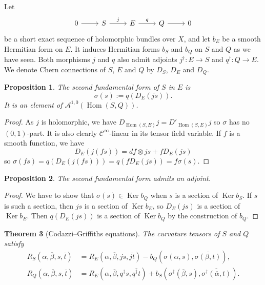 \documentclass[10pt,a4paper]{amsart}
\newtheorem{theo}{Theorem}[section]
\newtheorem{prop}[theo]{Proposition}
\theoremstyle{definition}
\newcommand{\cc}[1]{\mathcal{#1}}
\def\ov#1{\overline{#1}}
\DeclareMathOperator{\Ker}{Ker}
\DeclareMathOperator{\Hom}{Hom}
\def\snd{\sigma}
\begin{document}
Let
\[
\begin{tikzcd}
0 \ar[r] &
S \ar[r,"j"] &
E \ar[r,"q"] &
Q \ar[r] &
0
\end{tikzcd}
\]
be a short exact sequence of holomorphic bundles over $X$, and let $b_E$ be a smooth Hermitian form on $E$. It induces Hermitian forms $b_S$ and $b_Q$ on $S$ and $Q$ as we have seen. Both morphisms $j$ and $q$ also admit adjoints $j^\dagger: E \to S$ and $q^\dagger : Q \to E$. We denote Chern connections of $S$, $E$ and $Q$ by $D_S$, $D_E$ and $D_Q$.




\begin{prop}
The \emph{second fundamental form} of $S$ in $E$ is
\[
\snd(s) := q(D_E(js)).
\]
It is an element of $\cc A^{1,0}(\Hom(S,Q))$.
\end{prop}

\begin{proof}
As $j$ is holomorphic, we have $D_{\Hom(S,E)}j = D'_{\Hom(S,E)}j$ so $\snd$ has no $(0,1)$-part. It is also clearly $\cc C^\infty$-linear in its tensor field variable. If $f$ is a smooth function, we have
\[
D_E(j(fs))
= df \otimes js + f D_E(js)
\]
so $\snd(fs) = q(D_E(j(fs))) = q(f D_E(js)) = f\snd(s)$.
\end{proof}


\begin{prop}
The second fundamental form admits an adjoint.
\end{prop}

\begin{proof}
We have to show that $\snd(s) \in \Ker b_Q$ when $s$ is a section of $\Ker
b_S$. If $s$ is such a section, then $js$ is a section of $\Ker b_E$, so
$D_E(js)$ is a section of $\Ker b_E$. Then $q(D_E(js))$ is a section of $\Ker
b_Q$ by the construction of $b_Q$.
\end{proof}



\begin{theo}[Codazzi--Griffiths equations]
The curvature tensors of $S$ and $Q$ satisfy
\begin{align*}
R_S(\alpha, \ov\beta, s, \ov t)
&= R_E(\alpha, \ov\beta, js, \ov{jt})
- b_Q(\snd(\alpha, s), \ov{\snd(\beta, t)}),
\\
R_Q(\alpha, \ov\beta, s, \ov t)
&= R_E(\alpha, \ov\beta, q^\dagger s, \ov{q^\dagger t})
+ b_S(\snd^\dagger(\ov\beta, s), \ov{\snd^\dagger(\ov\alpha, t)}).
\end{align*}
\end{theo}
\end{document}
